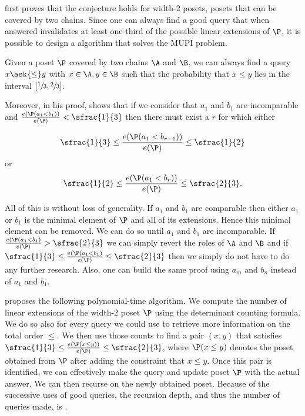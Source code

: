 \citet*{linial:1984} first proves that the \onethirdtwothird conjecture holds
for width-\(2\) posets, \ie posets that can be covered by two chains. Since one
can always find a good query that when answered invalidates at
least one-third of the possible linear extensions of \(\P\), it is possible to design a
 algorithm that solves the MUPI problem.

\begin{theorem}
Given a poset \(\P\) covered by two chains \(\A\) and \(\B\), we can always find
a query \(x \ask{\le} y\) with \(x \in \A, y \in \B\) such that the probability
that \(x \le y\) lies in the interval \([\sfrac{1}{3}, \sfrac{2}{3}]\).
\end{theorem}

Moreover, in his proof, \citet*{linial:1984} shows that if we consider that \(
a_1\) and \(b_1\) are incomparable and \(\frac{e(\P(a_1 < b_1))}{e(\P)} <
\sfrac{1}{3}\) then there must exist a \(r\) for which either

\begin{displaymath}
\sfrac{1}{3} \le \frac{e(\P(a_1 < b_{r-1}))}{e(\P)} \le \sfrac{1}{2}
\end{displaymath}
or
\begin{displaymath}
\sfrac{1}{2} \le \frac{e(\P(a_1 < b_{r}))}{e(\P)} \le \sfrac{2}{3}.
\end{displaymath}

All of this is without loss of generality. If \(a_1\) and \(b_1\) are
comparable then either \(a_1\) or \(b_1\) is the minimal element of \(\P\) and
all of its extensions. Hence this minimal element can be removed. We can do so
until \(a_1\) and \(b_1\) are incomparable. If \(\frac{e(\P(a_1 < b_1)}{e(\P)} >
\sfrac{2}{3}\) we can simply revert the roles of \(\A\) and \(\B\) and if
\(\sfrac{1}{3} \le \frac{e(\P(a_1 < b_1)}{e(\P)} \le \sfrac{2}{3}\) then we
simply do not have to do any further research. Also, one can build the same
proof using \(a_m\) and \(b_n\) instead of \(a_1\) and \(b_1\).

\citet*{linial:1984} proposes the following polynomial-time algorithm. We
compute the number of linear extensions of the width-\(2\) poset \(\P\) using
the determinant counting formula. We do so also for every query we could use to
retrieve more information on the total order \(\le\). We then use those counts
to find a pair \((x,y)\) that satisfies \(\sfrac{1}{3} \le \frac{e(\P(x \le
y))}{e(\P)} \le \sfrac{2}{3}\), where \(\P(x \le y)\) denotes the poset obtained
from \(\P\) after adding the constraint that \(x \le y\). Once this pair is
identified, we can effectively make the query and update poset \(\P\) with the
actual answer. We can then recurse on the newly obtained poset. Because of the
successive uses of good queries, the recursion depth, and thus the number of
queries made, is .

